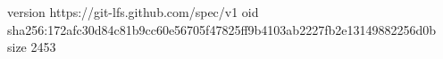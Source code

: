 version https://git-lfs.github.com/spec/v1
oid sha256:172afc30d84c81b9cc60e56705f47825ff9b4103ab2227fb2e13149882256d0b
size 2453
